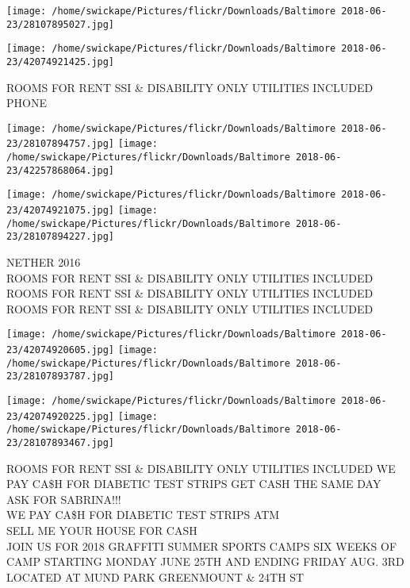 \documentclass[10pt,letterpaper]{article}
\begin{document}
\texttt{[image: /home/swickape/Pictures/flickr/Downloads/Baltimore 2018-06-23/28107895027.jpg]}

\vspace{0.25in}
\texttt{[image: /home/swickape/Pictures/flickr/Downloads/Baltimore 2018-06-23/42074921425.jpg]}

ROOMS FOR RENT SSI \& DISABILITY ONLY UTILITIES INCLUDED\\
PHONE\\
\pagebreak

\texttt{[image: /home/swickape/Pictures/flickr/Downloads/Baltimore 2018-06-23/28107894757.jpg]}
\texttt{[image: /home/swickape/Pictures/flickr/Downloads/Baltimore 2018-06-23/42257868064.jpg]}

\texttt{[image: /home/swickape/Pictures/flickr/Downloads/Baltimore 2018-06-23/42074921075.jpg]}
\texttt{[image: /home/swickape/Pictures/flickr/Downloads/Baltimore 2018-06-23/28107894227.jpg]}

NETHER 2016\\
ROOMS FOR RENT SSI \& DISABILITY ONLY UTILITIES INCLUDED\\
ROOMS FOR RENT SSI \& DISABILITY ONLY UTILITIES INCLUDED\\
ROOMS FOR RENT SSI \& DISABILITY ONLY UTILITIES INCLUDED\\
\pagebreak

\texttt{[image: /home/swickape/Pictures/flickr/Downloads/Baltimore 2018-06-23/42074920605.jpg]}
\texttt{[image: /home/swickape/Pictures/flickr/Downloads/Baltimore 2018-06-23/28107893787.jpg]}

\texttt{[image: /home/swickape/Pictures/flickr/Downloads/Baltimore 2018-06-23/42074920225.jpg]}
\texttt{[image: /home/swickape/Pictures/flickr/Downloads/Baltimore 2018-06-23/28107893467.jpg]}

ROOMS FOR RENT SSI \& DISABILITY ONLY UTILITIES INCLUDED WE PAY CA\$H FOR DIABETIC TEST STRIPS GET CASH THE SAME DAY ASK FOR SABRINA!!!\\
WE PAY CA\$H FOR DIABETIC TEST STRIPS ATM\\
SELL ME YOUR HOUSE FOR CASH\\
JOIN US FOR 2018 GRAFFITI SUMMER SPORTS CAMPS SIX WEEKS OF CAMP STARTING MONDAY JUNE 25TH AND ENDING FRIDAY AUG. 3RD LOCATED AT MUND PARK GREENMOUNT \& 24TH ST\\
\pagebreak
\end{document}
